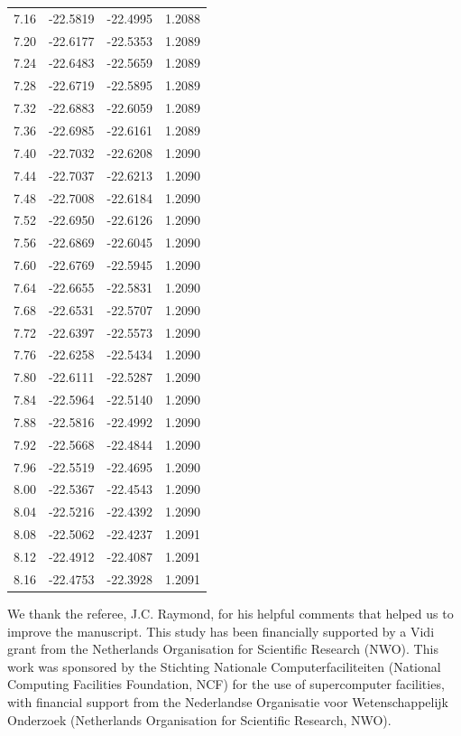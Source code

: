 \documentclass[floatfix,traditabstract,preprint2]{aa}
\begin{document}
\begin{table}[!htbp]
\begin{tabular}{c  c c c}
7.16 & -22.5819 & -22.4995 & 1.2088\\
7.20 & -22.6177 & -22.5353 & 1.2089\\
7.24 & -22.6483 & -22.5659 & 1.2089\\
7.28 & -22.6719 & -22.5895 & 1.2089\\
7.32 & -22.6883 & -22.6059 & 1.2089\\
7.36 & -22.6985 & -22.6161 & 1.2089\\
7.40 & -22.7032 & -22.6208 & 1.2090\\
7.44 & -22.7037 & -22.6213 & 1.2090\\
7.48 & -22.7008 & -22.6184 & 1.2090\\
7.52 & -22.6950 & -22.6126 & 1.2090\\
7.56 & -22.6869 & -22.6045 & 1.2090\\
7.60 & -22.6769 & -22.5945 & 1.2090\\
7.64 & -22.6655 & -22.5831 & 1.2090\\
7.68 & -22.6531 & -22.5707 & 1.2090\\
7.72 & -22.6397 & -22.5573 & 1.2090\\
7.76 & -22.6258 & -22.5434 & 1.2090\\
7.80 & -22.6111 & -22.5287 & 1.2090\\
7.84 & -22.5964 & -22.5140 & 1.2090\\
7.88 & -22.5816 & -22.4992 & 1.2090\\
7.92 & -22.5668 & -22.4844 & 1.2090\\
7.96 & -22.5519 & -22.4695 & 1.2090\\
8.00 & -22.5367 & -22.4543 & 1.2090\\
8.04 & -22.5216 & -22.4392 & 1.2090\\
8.08 & -22.5062 & -22.4237 & 1.2091\\
8.12 & -22.4912 & -22.4087 & 1.2091\\
8.16 & -22.4753 & -22.3928 & 1.2091\\
\hline                                   
\end{tabular}
\end{table}  

 \begin{acknowledgements}
We thank the referee, J.C. Raymond, for his helpful comments that helped us to improve the manuscript.
This study has been financially supported by a Vidi grant from the Netherlands Organisation for Scientific Research (NWO). This work was sponsored by the Stichting Nationale Computerfaciliteiten (National Computing Facilities Foundation, NCF) for the use of supercomputer facilities, with financial support from the Nederlandse Organisatie voor Wetenschappelijk Onderzoek (Netherlands Organisation for Scientific Research, NWO). 
 \end{acknowledgements}
\end{document}
